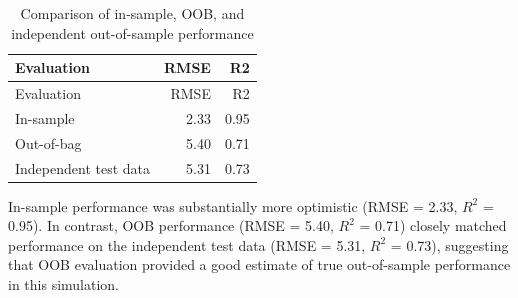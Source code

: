 \documentclass[
  letterpaper,
  DIV=11,
  numbers=noendperiod]{scrreprt}
\newenvironment{Shaded}{\begin{snugshade}}{\end{snugshade}}
\newcommand{\AttributeTok}[1]{\textcolor[rgb]{0.40,0.45,0.13}{#1}}
\newcommand{\DecValTok}[1]{\textcolor[rgb]{0.68,0.00,0.00}{#1}}
\newcommand{\FunctionTok}[1]{\textcolor[rgb]{0.28,0.35,0.67}{#1}}
\newcommand{\NormalTok}[1]{\textcolor[rgb]{0.00,0.23,0.31}{#1}}
\newcommand{\OtherTok}[1]{\textcolor[rgb]{0.00,0.23,0.31}{#1}}
\newcommand{\SpecialCharTok}[1]{\textcolor[rgb]{0.37,0.37,0.37}{#1}}
\newcommand{\StringTok}[1]{\textcolor[rgb]{0.13,0.47,0.30}{#1}}
\begin{document}
\begin{Shaded}
\end{Shaded}

\begin{longtable}[]{@{}lrr@{}}
\caption{Comparison of in-sample, OOB, and independent out-of-sample
performance}\tabularnewline
\toprule\noalign{}
Evaluation & RMSE & R2 \\
\midrule\noalign{}
\endfirsthead
\toprule\noalign{}
Evaluation & RMSE & R2 \\
\midrule\noalign{}
\endhead
\bottomrule\noalign{}
\endlastfoot
In-sample & 2.33 & 0.95 \\
Out-of-bag & 5.40 & 0.71 \\
Independent test data & 5.31 & 0.73 \\
\end{longtable}

In-sample performance was substantially more optimistic (RMSE = 2.33,
\(R^2\) = 0.95). In contrast, OOB performance (RMSE = 5.40, \(R^2\) =
0.71) closely matched performance on the independent test data (RMSE =
5.31, \(R^2\) = 0.73), suggesting that OOB evaluation provided a good
estimate of true out-of-sample performance in this simulation.
\end{document}
